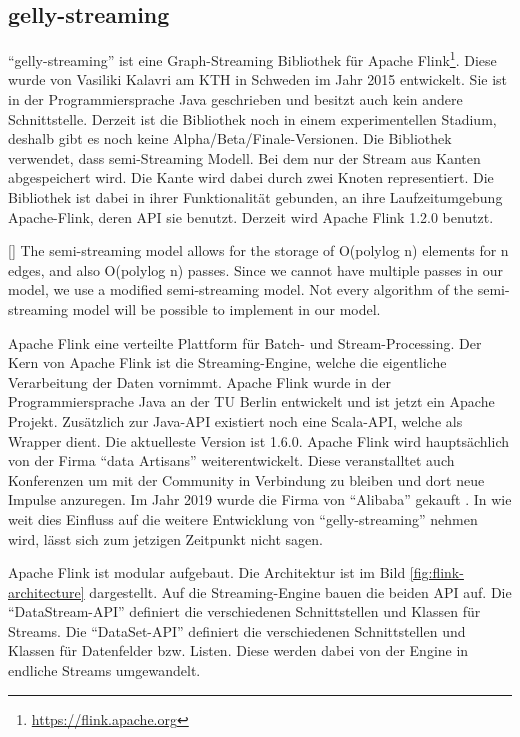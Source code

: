 \subsection{gelly-streaming}
\enquote{gelly-streaming} ist eine Graph-Streaming Bibliothek für Apache Flink\footnote{\url{https://flink.apache.org}}.
Diese wurde von Vasiliki Kalavri am KTH in Schweden im Jahr 2015 entwickelt.
Sie ist in der Programmiersprache Java geschrieben und besitzt auch kein andere
Schnittstelle. Derzeit ist die Bibliothek noch in einem experimentellen Stadium,
deshalb gibt es noch keine Alpha/Beta/Finale-Versionen. Die Bibliothek verwendet,
dass semi-Streaming Modell. Bei dem nur der Stream aus Kanten abgespeichert wird.
Die Kante wird dabei durch zwei Knoten representiert. Die Bibliothek ist dabei
in ihrer Funktionalität gebunden, an ihre Laufzeitumgebung
Apache-Flink, deren \gls{API} sie benutzt. Derzeit wird Apache Flink 1.2.0 benutzt.

[\cite{Bali2015}]{
The semi-streaming model allows for the storage of O(polylog n) elements for n
edges, and also O(polylog n) passes. Since we cannot have multiple passes in our
model, we use a modified semi-streaming model. Not every algorithm of the
semi-streaming model will be possible to implement in our model.
}

Apache Flink eine verteilte Plattform für Batch- und Stream-Processing. Der Kern
von Apache Flink ist die Streaming-Engine, welche die eigentliche Verarbeitung
der Daten vornimmt. Apache Flink wurde in der Programmiersprache Java an der TU
Berlin entwickelt und ist jetzt ein Apache Projekt. Zusätzlich zur Java-\gls{API}
existiert noch eine Scala-\gls{API}, welche als Wrapper dient. Die aktuelleste
Version ist 1.6.0. Apache Flink wird hauptsächlich von der Firma \enquote{data Artisans}
weiterentwickelt. Diese veranstalltet auch Konferenzen um mit der Community in
Verbindung zu bleiben und dort neue Impulse anzuregen. Im Jahr 2019 wurde die
Firma von \enquote{Alibaba} gekauft \parencite{Parbel2019}. In wie weit dies
Einfluss auf die weitere Entwicklung von \enquote{gelly-streaming} nehmen wird,
lässt sich zum jetzigen Zeitpunkt nicht sagen.

Apache Flink ist modular aufgebaut. Die Architektur ist im Bild \ref{fig:flink-architecture}
dargestellt. Auf die Streaming-Engine bauen die beiden \gls{API} auf.
Die \enquote{DataStream-API} definiert die verschiedenen Schnittstellen und Klassen
für Streams. Die \enquote{DataSet-API} definiert die verschiedenen Schnittstellen
und Klassen für Datenfelder bzw. Listen. Diese werden dabei von der Engine in
endliche Streams umgewandelt.

